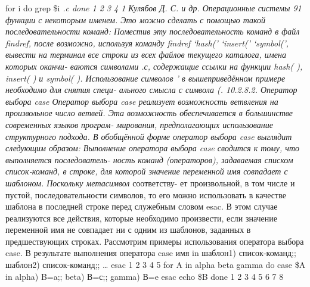 \documentclass[
  letterpaper,
  DIV=11,
  numbers=noendperiod]{scrartcl}
\begin{document}
for i do grep \$i \emph{.c done 1 2 3 4 1 Кулябов Д. С. и др.
Операционные системы 91 функции с некоторым именем. Это можно сделать с
помощью такой последовательности команд: Поместив эту последовательность
команд в файл findref, после возможно, используя команду findref `hash('
`insert(' `symbol(', вывести на терминал все строки из всех файлов
текущего каталога, имена которых оканчи- ваются символами .с, содержащие
ссылки на функции hash( ), insert( ) и symbol( ). Использование символов
' в вышеприведённом примере необходимо для снятия специ- ального смысла
с символа (. 10.2.8.2. Оператор выбора case Оператор выбора case
реализует возможность ветвления на произвольное число ветвей. Эта
возможность обеспечивается в большинстве современных языков програм-
мирования, предполагающих использование структурного подхода. В
обобщённой форме оператор выбора case выглядит следующим образом:
Выполнение оператора выбора case сводится к тому, что выполняется
последователь- ность команд (операторов), задаваемая списком
список-команд, в строке, для которой значение переменной имя совпадает с
шаблоном. Поскольку метасимвол} соответству- ет произвольной, в том
числе и пустой, последовательности символов, то его можно использовать в
качестве шаблона в последней строке перед служебным словом esac. В этом
случае реализуются все действия, которые необходимо произвести, если
значение переменной имя не совпадает ни с одним из шаблонов, заданных в
предшествующих строках. Рассмотрим примеры использования оператора
выбора case. В результате выполнения оператора case имя in шаблон1)
список-команд;; шаблон2) список-команд;; \ldots{} esac 1 2 3 4 5 for A
in alpha beta gamma do case \$A in alpha) B=a;; beta) В=с;; gamma) В=e
esac echo \$B done 1 2 3 4 5 6 7 8
\end{document}
